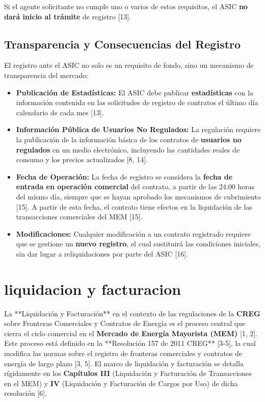 \documentclass[a5paper]{book}%
\begin{document}
  Si el agente solicitante no cumple uno o varios de estos requisitos, el ASIC \textbf{no dará inicio al trámite} de registro [13].
  
  \subsection{Transparencia y Consecuencias del Registro}
  
  El registro ante el ASIC no solo es un requisito de fondo, sino un mecanismo de transparencia del mercado:
  
  \begin{itemize}
  	\item \textbf{Publicación de Estadísticas:} El ASIC debe publicar \textbf{estadísticas} con la información contenida en las solicitudes de registro de contratos el último día calendario de cada mes [13].
  	\item \textbf{Información Pública de Usuarios No Regulados:} La regulación requiere la publicación de la información básica de los contratos de \textbf{usuarios no regulados} en un medio electrónico, incluyendo las cantidades reales de consumo y los precios actualizados [8, 14].
  	\item \textbf{Fecha de Operación:} La fecha de registro se considera la \textbf{fecha de entrada en operación comercial} del contrato, a partir de las 24:00 horas del mismo día, siempre que se hayan aprobado los mecanismos de cubrimiento [15]. A partir de esta fecha, el contrato tiene efectos en la liquidación de las transacciones comerciales del MEM [15].
  	\item \textbf{Modificaciones:} Cualquier modificación a un contrato registrado requiere que se gestione un \textbf{nuevo registro}, el cual sustituirá las condiciones iniciales, sin dar lugar a reliquidaciones por parte del ASIC [16].
  \end{itemize}
  
  
  \section{liquidacion y facturacion}
  
  La **Liquidación y Facturación** en el contexto de las regulaciones de la \textbf{CREG} sobre Fronteras Comerciales y Contratos de Energía es el proceso central que cierra el ciclo comercial en el \textbf{Mercado de Energía Mayorista (MEM)} [1, 2]. Este proceso está definido en la **Resolución 157 de 2011 CREG** [3-5], la cual modifica las normas sobre el registro de fronteras comerciales y contratos de energía de largo plazo [3, 5]. El marco de liquidación y facturación se detalla rígidamente en los \textbf{Capítulos III} (Liquidación y Facturación de Transacciones en el MEM) y \textbf{IV} (Liquidación y Facturación de Cargos por Uso) de dicha resolución [6].
  
\end{document}
